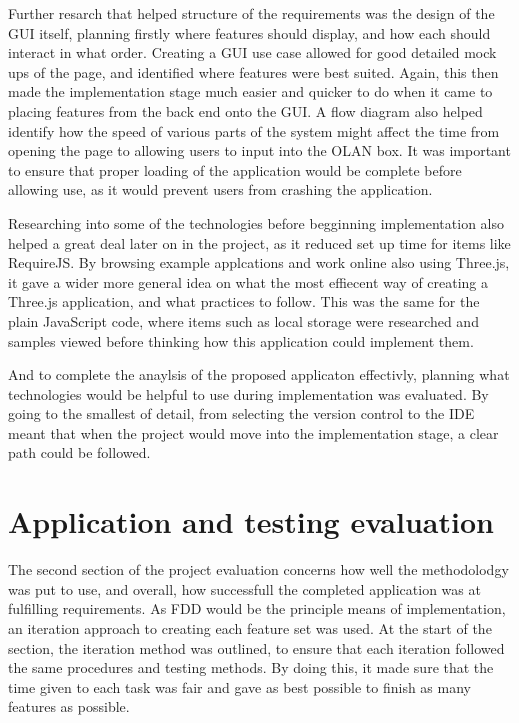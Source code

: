 Further resarch that helped structure of the requirements was the design of the GUI itself, planning firstly where features should display, and how each should interact in what order. Creating a GUI use case allowed for good detailed mock ups of the page, and identified where features were best suited. Again, this then made the implementation stage much easier and quicker to do when it came to placing features from the back end onto the GUI. A flow diagram also helped identify how the speed of various parts of the system might affect the time from opening the page to allowing users to input into the OLAN box. It was important to ensure that proper loading of the application would be complete before allowing use, as it would prevent users from crashing the application.

Researching into some of the technologies before begginning implementation also helped a great deal later on in the project, as it reduced set up time for items like RequireJS. By browsing example applcations and work online also using Three.js, it gave a wider more general idea on what the most effiecent way of creating a Three.js application, and what practices to follow. This was the same for the plain JavaScript code, where items such as local storage were researched and samples viewed before thinking how this application could implement them.

And to complete the anaylsis of the proposed applicaton effectivly, planning what technologies would be helpful to use during implementation was evaluated. By going to the smallest of detail, from selecting the version control to the IDE meant that when the project would move into the implementation stage, a clear path could be followed.

\section{Application and testing evaluation}
The second section of the project evaluation concerns how well the methodolodgy was put to use, and overall, how successfull the completed application was at fulfilling requirements. As FDD would be the principle means of implementation, an iteration approach to creating each feature set was used. At the start of the section, the iteration method was outlined, to ensure that each iteration followed the same procedures and testing methods. By doing this, it made sure that the time given to each task was fair and gave as best possible to finish as many features as possible.

